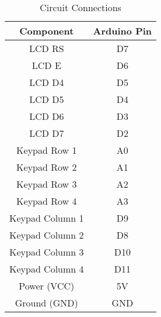 \begin{table}[htps]
\centering
\begin{tabular}{|c|c|}
\hline
\textbf{Component} & \textbf{Arduino Pin} \\ 
\hline
LCD RS & D7 \\ 
\hline
LCD E & D6 \\ 
\hline
LCD D4 & D5 \\ 
\hline
LCD D5 & D4 \\ 
\hline
LCD D6 & D3 \\ 
\hline
LCD D7 & D2 \\ 
\hline
Keypad Row 1 & A0 \\ 
\hline
Keypad Row 2 & A1 \\ 
\hline
Keypad Row 3 & A2 \\ 
\hline
Keypad Row 4 & A3 \\ 
\hline
Keypad Column 1 & D9 \\ 
\hline
Keypad Column 2 & D8 \\ 
\hline
Keypad Column 3 & D10 \\ 
\hline
Keypad Column 4 & D11 \\ 
\hline
Power (VCC) & 5V \\ 
\hline
Ground (GND) & GND \\ 
\hline
\end{tabular}
\caption{Circuit Connections}
\label{tab:connections}
\end{table}
